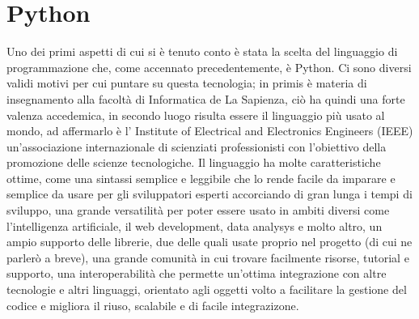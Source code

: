 \documentclass[binding=0.6cm]{sapthesis}
\begin{document}
\section{Python}
Uno dei primi aspetti di cui si è tenuto conto è stata
la scelta del linguaggio di programmazione che, come accennato precedentemente, è Python. Ci sono diversi validi motivi per cui 
puntare su questa tecnologia;
in primis è materia di insegnamento alla facoltà di Informatica de La Sapienza, ciò ha quindi una forte valenza accedemica, 
in secondo luogo risulta essere il linguaggio più
usato al mondo, ad affermarlo è l' Institute of Electrical and Electronics Engineers (IEEE)\cite{IEEEwebsite}\cite{IEEESpectrumArticle2023} 
un'associazione internazionale di scienziati professionisti con l'obiettivo della promozione delle scienze tecnologiche. Il linguaggio ha molte caratteristiche ottime, come
una sintassi semplice e leggibile che lo rende facile da imparare e semplice da usare per gli sviluppatori esperti accorciando di gran lunga i tempi di sviluppo,
una grande versatilità per poter essere usato in ambiti diversi come l'intelligenza artificiale, il web development, data analysys e molto altro, un ampio
supporto delle librerie, due delle quali usate proprio nel progetto (di cui ne parlerò a breve), una grande comunità in cui trovare facilmente risorse, tutorial e supporto,
una interoperabilità che permette un'ottima integrazione con altre tecnologie e altri linguaggi, orientato agli oggetti volto a facilitare la gestione del codice e migliora il riuso,
scalabile e di facile integrazizone. 
\end{document}

